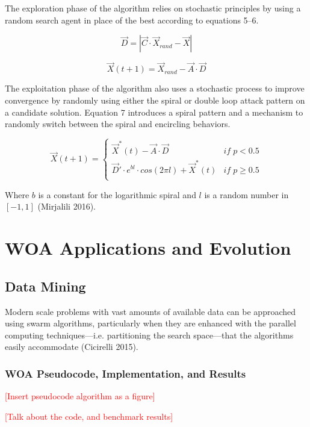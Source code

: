 \documentclass[11pt]{article}
\newcommand{\TODO}[1]{\textcolor{red}{[#1]}}
\begin{document}
The exploration phase of the algorithm relies on stochastic principles by using a random search agent in place of the best according to equations 5--6.

\begin{equation}
	\vec{D} = |\vec{C}\cdot\vec{X}_{rand} - \vec{X}|
\end{equation}

\begin{equation}
	\vec{X}(t+1) = \vec{X}_{rand} - \vec{A}\cdot\vec{D}
\end{equation}

The exploitation phase of the algorithm also uses a stochastic process to improve convergence by randomly using either the spiral or double loop attack pattern on a candidate solution.
Equation 7 introduces a spiral pattern and a mechanism to randomly switch between the spiral and encircling behaviors.

\begin{equation}
	\vec{X}(t+1) =
	\begin{cases}
		\vec{X}^*(t) - \vec{A}\cdot\vec{D} &if \; p < 0.5\\
		\vec{D}'\cdot e^{bl} \cdot cos(2\pi l) + \vec{X}^*(t) &if \; p \geq 0.5\\
   \end{cases}
\end{equation}

Where $b$ is a constant for the logarithmic spiral and $l$ is a random number in $[-1, 1]$ (Mirjalili 2016).

\section*{WOA Applications and Evolution}
\subsection*{Data Mining}
Modern scale problems with vast amounts of available data can be approached using swarm algorithms, particularly when they are enhanced with the parallel computing techniques---i.e. partitioning the search space---that the algorithms easily accommodate (Cicirelli 2015).

\subsubsection*{WOA Pseudocode, Implementation, and Results}
\TODO{Insert pseudocode algorithm as a figure}

\TODO{Talk about the code, and benchmark results}
\end{document}
